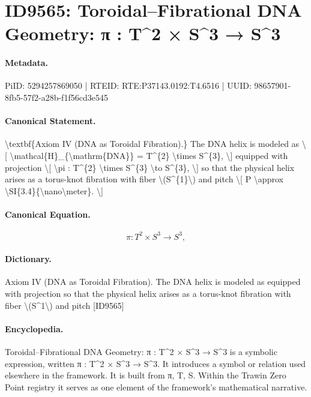 \section*{ID9565: Toroidal–Fibrational DNA Geometry: π : T\textasciicircum{}2 × S\textasciicircum{}3 → S\textasciicircum{}3}
\paragraph{Metadata.}
PiID: 5294257869050 | RTEID: RTE:P37143.0192:T4.6516 | UUID: 98657901-8fb5-57f2-a28b-f1f56cd3e545

\paragraph{Canonical Statement.}
\textbackslash{}textbf\{Axiom IV (DNA as Toroidal Fibration).\} The DNA helix is modeled as \textbackslash{}[ \textbackslash{}mathcal\{H\}\_\{\textbackslash{}mathrm\{DNA\}\} = T\textasciicircum{}\{2\} \textbackslash{}times S\textasciicircum{}\{3\}, \textbackslash{}] equipped with projection \textbackslash{}[ \textbackslash{}pi : T\textasciicircum{}\{2\} \textbackslash{}times S\textasciicircum{}\{3\} \textbackslash{}to S\textasciicircum{}\{3\}, \textbackslash{}] so that the physical helix arises as a torus-knot fibration with fiber \textbackslash{}(S\textasciicircum{}\{1\}\textbackslash{}) and pitch \textbackslash{}[ P \textbackslash{}approx \textbackslash{}SI\{3.4\}\{\textbackslash{}nano\textbackslash{}meter\}. \textbackslash{}]

\paragraph{Canonical Equation.}
\[
\pi : T^{2} \times S^{3} \to S^{3},
\]

\paragraph{Dictionary.}
Axiom IV (DNA as Toroidal Fibration). The DNA helix is modeled as equipped with projection so that the physical helix arises as a torus-knot fibration with fiber \textbackslash{}(S\textasciicircum{}1\textbackslash{}) and pitch [ID9565]

\paragraph{Encyclopedia.}
Toroidal–Fibrational DNA Geometry: π : T\textasciicircum{}2 × S\textasciicircum{}3 → S\textasciicircum{}3 is a symbolic expression, written π : T\textasciicircum{}2 × S\textasciicircum{}3 → S\textasciicircum{}3. It introduces a symbol or relation used elsewhere in the framework. It is built from π, T, S. Within the Trawin Zero Point registry it serves as one element of the framework's mathematical narrative.
